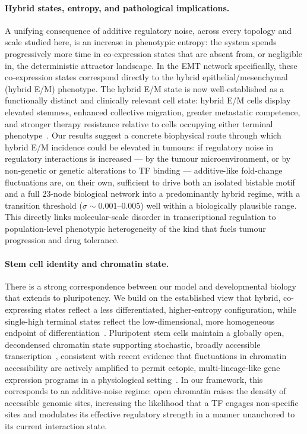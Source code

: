 \documentclass[11pt]{article}
\begin{document}
\paragraph{Hybrid states, entropy, and pathological implications.}
A unifying consequence of additive regulatory noise, across every topology and scale studied here, is an increase in phenotypic entropy: the system spends progressively more time in co-expression states that are absent from, or negligible in, the deterministic attractor landscape. In the EMT network specifically, these co-expression states correspond directly to the hybrid epithelial/mesenchymal (hybrid E/M) phenotype. The hybrid E/M state is now well-established as a functionally distinct and clinically relevant cell state: hybrid E/M cells display elevated stemness, enhanced collective migration, greater metastatic competence, and stronger therapy resistance relative to cells occupying either terminal phenotype~\cite{Pastushenko2019EMTMetastasis, jolly2015implications, pasani2020hybrid, Sahoo2021}. Our results suggest a concrete biophysical route through which hybrid E/M incidence could be elevated in tumours: if regulatory noise in regulatory interactions is increased --- by the tumour microenvironment, or by non-genetic or genetic alterations to TF binding --- additive-like fold-change fluctuations are, on their own, sufficient to drive both an isolated bistable motif and a full 23-node biological network into a predominantly hybrid regime, with a transition threshold ($\sigma \sim 0.001$--0.005) well within a biologically plausible range. This directly links molecular-scale disorder in transcriptional regulation to population-level phenotypic heterogeneity of the kind that fuels tumour progression and drug tolerance.

\paragraph{Stem cell identity and chromatin state.}
There is a strong correspondence between our model and developmental biology that extends to pluripotency. We build on the established view that hybrid, co-expressing states reflect a less differentiated, higher-entropy configuration, while single-high terminal states reflect the low-dimensional, more homogeneous endpoint of differentiation~\cite{Teschendorff2017Single-cellTranscriptome, Hari2025LowNetworks}. Pluripotent stem cells maintain a globally open, decondensed chromatin state supporting stochastic, broadly accessible transcription~\cite{Meshorer2006HyperdynamicCells, Efroni2008GlobalCells}, consistent with recent evidence that fluctuations in chromatin accessibility are actively amplified to permit ectopic, multi-lineage-like gene expression programs in a physiological setting~\cite{Gamble2025}. In our framework, this corresponds to an additive-noise regime: open chromatin raises the density of accessible genomic sites, increasing the likelihood that a TF engages non-specific sites and modulates its effective regulatory strength in a manner unanchored to its current interaction state.
\end{document}
